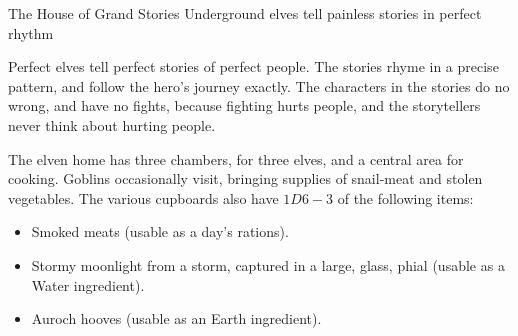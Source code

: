 \begin{multicols}{2}
\elf

{The House of Grand Stories}%
{Underground elves tell painless stories in perfect rhythm}%

Perfect elves tell perfect stories of perfect people.
The stories rhyme in a precise pattern, and follow the hero's journey exactly.
The characters in the stories do no wrong, and have no fights, because fighting hurts people, and the storytellers never think about hurting people.

The elven home has three chambers, for three elves, and a central area for cooking.
Goblins occasionally visit, bringing supplies of snail-meat and stolen vegetables.
The various cupboards also have $1D6-3$ of the following items:

\begin{itemize}
  \item
  Smoked meats (usable as a day's rations).
  \item
  Stormy moonlight from a storm, captured in a large, glass, phial (usable as a Water \gls{ingredient}).
  \item
  Auroch hooves (usable as an Earth \gls{ingredient}).
\end{itemize}

\elf

\end{multicols}

